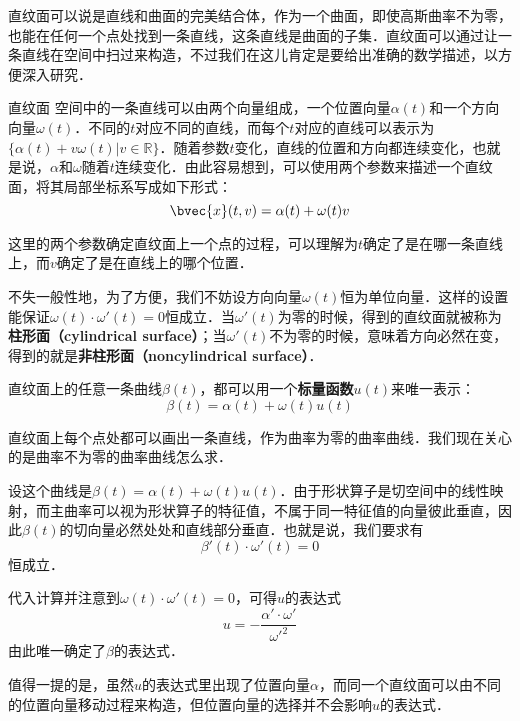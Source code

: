 

直纹面可以说是直线和曲面的完美结合体，作为一个曲面，即使高斯曲率不为零，也能在任何一个点处找到一条直线，这条直线是曲面的子集．直纹面可以通过让一条直线在空间中扫过来构造，不过我们在这儿肯定是要给出准确的数学描述，以方便深入研究．

\begin{definition}{直纹面}
空间中的一条直线可以由两个向量组成，一个位置向量$\alpha(t)$和一个方向向量$\omega(t)$．不同的$t$对应不同的直线，而每个$t$对应的直线可以表示为$\{\alpha(t)+v\omega(t)|v\in\mathbb{R}\}$．随着参数$t$变化，直线的位置和方向都连续变化，也就是说，$\alpha$和$\omega$随着$t$连续变化．由此容易想到，可以使用两个参数来描述一个直纹面，将其局部坐标系写成如下形式：
\begin{equation}
\bvec{x}(t, v)=\alpha(t)+\omega(t)v
\end{equation}
\end{definition}


这里的两个参数确定直纹面上一个点的过程，可以理解为$t$确定了是在哪一条直线上，而$v$确定了是在直线上的哪个位置．

不失一般性地，为了方便，我们不妨设方向向量$\omega(t)$恒为单位向量．这样的设置能保证$\omega(t)\cdot\omega'(t)=0$恒成立．当$\omega'(t)$为零的时候，得到的直纹面就被称为\textbf{柱形面（cylindrical surface）}；当$\omega'(t)$不为零的时候，意味着方向必然在变，得到的就是\textbf{非柱形面（noncylindrical surface）}．

直纹面上的任意一条曲线$\beta(t)$，都可以用一个\textbf{标量函数}$u(t)$来唯一表示：\begin{equation}
\beta(t)=\alpha(t)+\omega(t)u(t)
\end{equation}

直纹面上每个点处都可以画出一条直线，作为曲率为零的曲率曲线．我们现在关心的是曲率不为零的曲率曲线怎么求．

设这个曲线是$\beta(t)=\alpha(t)+\omega(t)u(t)$．由于形状算子是切空间中的线性映射，而主曲率可以视为形状算子的特征值，不属于同一特征值的向量彼此垂直，因此$\beta(t)$的切向量必然处处和直线部分垂直．也就是说，我们要求有
\begin{equation}
\beta'(t)\cdot\omega'(t)=0
\end{equation}
恒成立．

代入计算并注意到$\omega(t)\cdot\omega'(t)=0$，可得$u$的表达式\begin{equation}
u=-\frac{\alpha'\cdot\omega'}{\omega'^2}
\end{equation}
由此唯一确定了$\beta$的表达式．

值得一提的是，虽然$u$的表达式里出现了位置向量$\alpha$，而同一个直纹面可以由不同的位置向量移动过程来构造，但位置向量的选择并不会影响$u$的表达式．




